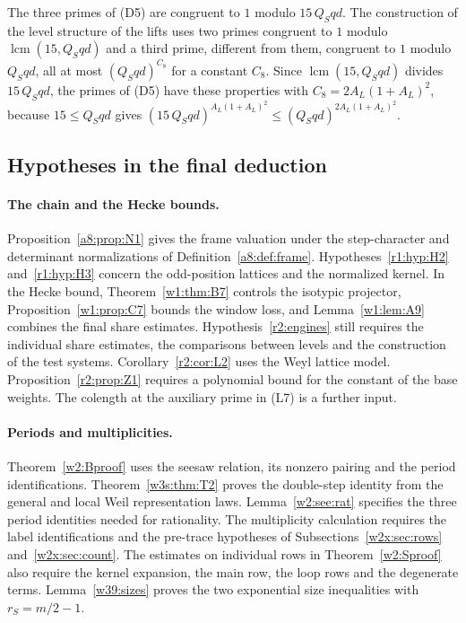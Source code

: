 The three primes of (D5) are congruent to $1$ modulo $15\,Q_Sqd$. The construction of the level structure of the lifts uses two primes congruent to $1$ modulo $\operatorname{lcm}(15,Q_Sqd)$ and a third prime, different from them, congruent to $1$ modulo $Q_Sqd$, all at most $(Q_Sqd)^{C_8}$ for a constant $C_8$. Since $\operatorname{lcm}(15,Q_Sqd)$ divides $15\,Q_Sqd$, the primes of (D5) have these properties with $C_8=2A_L(1+A_L)^2$, because $15\le Q_Sqd$ gives $(15\,Q_Sqd)^{A_L(1+A_L)^2}\le(Q_Sqd)^{2A_L(1+A_L)^2}$.

\subsection{Hypotheses in the final deduction}\label{sec:frontier}

\paragraph{The chain and the Hecke bounds.}\label{fr:sec:chain}\label{fr:sec:loss}
Proposition~\ref{a8:prop:N1} gives the frame valuation under the step-character
and determinant normalizations of Definition~\ref{a8:def:frame}.
Hypotheses~\ref{r1:hyp:H2} and~\ref{r1:hyp:H3} concern the odd-position
lattices and the normalized kernel. In the Hecke bound, Theorem~\ref{w1:thm:B7}
controls the isotypic projector, Proposition~\ref{w1:prop:C7} bounds the
window loss, and Lemma~\ref{w1:lem:A9} combines the final share estimates.
Hypothesis~\ref{r2:engines} still requires the individual share estimates,
the comparisons between levels and the construction of the test systems.
Corollary~\ref{r2:cor:L2} uses the Weyl lattice model. Proposition~\ref{r2:prop:Z1}
requires a polynomial bound for the constant of the base weights.
The colength at the auxiliary prime in (L7) is a further input.

\paragraph{Periods and multiplicities.}\label{fr:sec:frame}
Theorem~\ref{w2:Bproof} uses the seesaw relation, its nonzero pairing
and the period identifications. Theorem~\ref{w3s:thm:T2} proves the
double-step identity from the general and local Weil representation
laws. Lemma~\ref{w2:see:rat} specifies the three period identities
needed for rationality. The multiplicity calculation requires the
label identifications and the pre-trace hypotheses of
Subsections~\ref{w2x:sec:rows} and~\ref{w2x:sec:count}.
The estimates on individual rows in Theorem~\ref{w2:Sproof} also
require the kernel expansion, the main row, the loop rows and the
degenerate terms. Lemma~\ref{w39:sizes} proves the two exponential
size inequalities with $r_S=m/2-1$.

